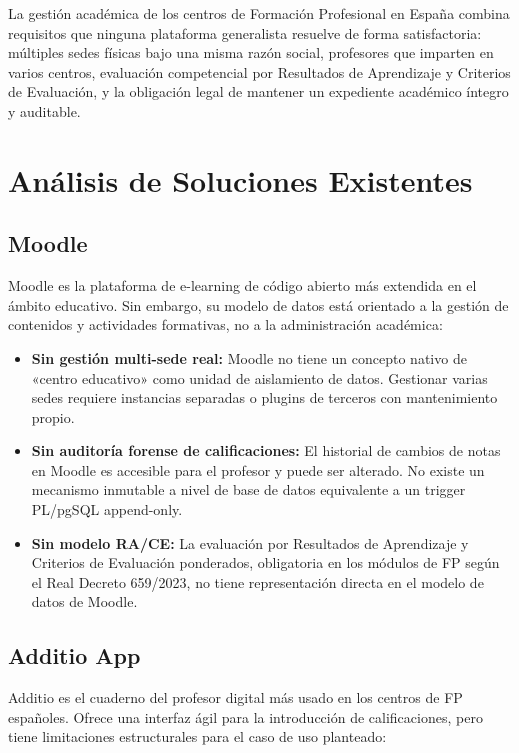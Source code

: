\documentclass[12pt, a4paper]{report}
\begin{document}
La gestión académica de los centros de Formación Profesional en España combina
requisitos que ninguna plataforma generalista resuelve de forma satisfactoria:
múltiples sedes físicas bajo una misma razón social, profesores que imparten en
varios centros, evaluación competencial por Resultados de Aprendizaje y Criterios
de Evaluación, y la obligación legal de mantener un expediente académico íntegro
y auditable.

\section{Análisis de Soluciones Existentes}

\subsection{Moodle}

Moodle es la plataforma de e-learning de código abierto más extendida en el ámbito
educativo. Sin embargo, su modelo de datos está orientado a la gestión de contenidos
y actividades formativas, no a la administración académica:

\begin{itemize}
  \item \textbf{Sin gestión multi-sede real:} Moodle no tiene un concepto nativo de
        «centro educativo» como unidad de aislamiento de datos. Gestionar varias sedes
        requiere instancias separadas o plugins de terceros con mantenimiento propio.
  \item \textbf{Sin auditoría forense de calificaciones:} El historial de cambios de
        notas en Moodle es accesible para el profesor y puede ser alterado. No existe
        un mecanismo inmutable a nivel de base de datos equivalente a un trigger
        PL/pgSQL append-only.
  \item \textbf{Sin modelo RA/CE:} La evaluación por Resultados de Aprendizaje y
        Criterios de Evaluación ponderados, obligatoria en los módulos de FP según
        el Real Decreto 659/2023, no tiene representación directa en el modelo de
        datos de Moodle.
\end{itemize}

\subsection{Additio App}

Additio es el cuaderno del profesor digital más usado en los centros de FP españoles.
Ofrece una interfaz ágil para la introducción de calificaciones, pero tiene
limitaciones estructurales para el caso de uso planteado:
\end{document}
